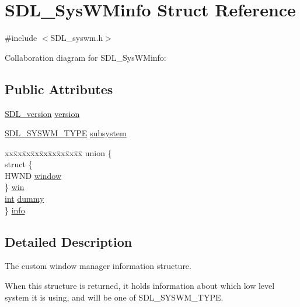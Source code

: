 \hypertarget{struct_s_d_l___sys_w_minfo}{\section{S\-D\-L\-\_\-\-Sys\-W\-Minfo Struct Reference}
\label{struct_s_d_l___sys_w_minfo}
}


{\ttfamily \#include $<$S\-D\-L\-\_\-syswm.\-h$>$}



Collaboration diagram for S\-D\-L\-\_\-\-Sys\-W\-Minfo\-:
\subsection*{Public Attributes}
\begin{DoxyCompactItemize}
\item 
\hyperlink{struct_s_d_l__version}{S\-D\-L\-\_\-version} \hyperlink{struct_s_d_l___sys_w_minfo_ac3a70af022d4849e9ff546595e94627f}{version}
\item 
\hyperlink{_s_d_l__syswm_8h_a064c26598287280fff2a00d6758ac4f7}{S\-D\-L\-\_\-\-S\-Y\-S\-W\-M\-\_\-\-T\-Y\-P\-E} \hyperlink{struct_s_d_l___sys_w_minfo_a438b6a06ab3ee417293c7b7fc5a23855}{subsystem}
\item 
\begin{tabbing}
xx\=xx\=xx\=xx\=xx\=xx\=xx\=xx\=xx\=\kill
union \{\\
\>struct \{\\
\>\>HWND \hyperlink{struct_s_d_l___sys_w_minfo_af06225591ff07e837bbd037728a525b9}{window}\\
\>\} \hyperlink{struct_s_d_l___sys_w_minfo_a6319c3f4bccd2505edc7023380981a27}{win}\\
\>\hyperlink{_s_d_l__thread_8h_a6a64f9be4433e4de6e2f2f548cf3c08e}{int} \hyperlink{struct_s_d_l___sys_w_minfo_a1edbb8fc4fc59081efe6070f9167c1cf}{dummy}\\
\} \hyperlink{struct_s_d_l___sys_w_minfo_a96639a5304141225509483baf5910439}{info}\\

\end{tabbing}\end{DoxyCompactItemize}


\subsection{Detailed Description}
The custom window manager information structure.

When this structure is returned, it holds information about which low level system it is using, and will be one of S\-D\-L\-\_\-\-S\-Y\-S\-W\-M\-\_\-\-T\-Y\-P\-E. 

